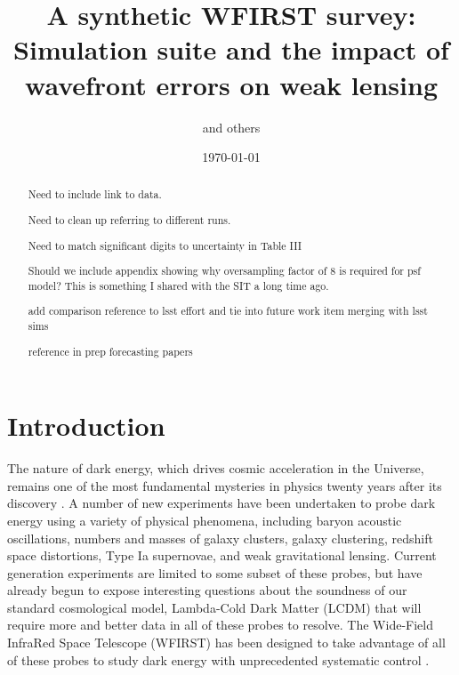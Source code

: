 \documentclass[aps,prd, amsmath,amssymb,superscriptaddress,showkeys,nofootinbib,reprint,preprintnumbers]{revtex4-1}
\begin{document}
\title{A synthetic WFIRST survey: Simulation suite and the impact of wavefront errors on weak lensing}

\author{and others}


\noaffiliation

\date{\today}

\label{firstpage}

\begin{abstract}
Need to include link to data.

Need to clean up referring to different runs.

Need to match significant digits to uncertainty in Table III

Should we include appendix showing why oversampling factor of 8 is required for psf model? This is something I shared with the SIT a long time ago.

add comparison reference to lsst effort and tie into future work item merging with lsst sims

reference in prep forecasting papers


\end{abstract}

\keywords{}

\maketitle


\section{Introduction}\label{sec:intro}

The nature of dark energy, which drives cosmic acceleration in the Universe, remains one of the most fundamental mysteries in physics twenty years after its discovery \cite{riess98,perlmutter99,detf,Frieman:2008sn,weinberg13}. 
A number of new experiments have been undertaken to probe dark energy using a variety of physical phenomena, including baryon acoustic oscillations, numbers and masses of galaxy clusters, galaxy clustering, redshift space distortions, Type Ia supernovae, and weak gravitational lensing. 
Current generation experiments are limited to some subset of these probes, but have already begun to expose interesting questions about the soundness of our standard cosmological model, Lambda-Cold Dark Matter (LCDM) that will require more and better data in all of these probes to resolve. 
The Wide-Field InfraRed Space Telescope (WFIRST) \cite{wfirst} has been designed to take advantage of all of these probes to study dark energy with unprecedented systematic control \cite{2019BAAS...51c.341D,2019arXiv190205569A}.
\end{document}
